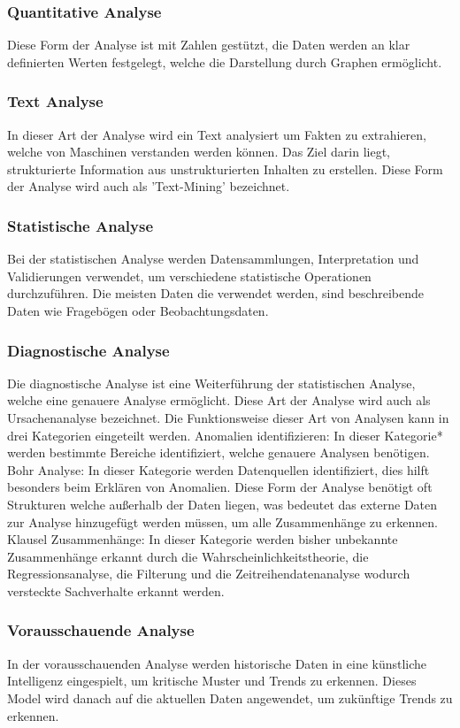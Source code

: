 \subsubsection{Quantitative Analyse}
Diese Form der Analyse ist mit Zahlen gestützt, die Daten werden an klar definierten Werten festgelegt, welche die Darstellung durch Graphen ermöglicht.		
\subsubsection{Text Analyse}
In dieser Art der Analyse wird ein Text analysiert um Fakten zu extrahieren, welche von Maschinen verstanden werden können. 
Das Ziel darin liegt, strukturierte Information aus unstrukturierten Inhalten zu erstellen. Diese Form der Analyse wird auch als 'Text-Mining' bezeichnet.		
\subsubsection{Statistische Analyse}
Bei der statistischen Analyse werden Datensammlungen, Interpretation und Validierungen verwendet, um verschiedene statistische Operationen durchzuführen. 
Die meisten Daten die verwendet werden, sind beschreibende Daten wie Fragebögen oder Beobachtungsdaten. 			
\subsubsection{Diagnostische Analyse}
Die diagnostische Analyse ist eine Weiterführung der statistischen Analyse, welche eine genauere Analyse ermöglicht. Diese Art der Analyse wird auch als Ursachenanalyse bezeichnet. Die Funktionsweise dieser Art von Analysen kann in drei Kategorien eingeteilt werden. \newline
Anomalien identifizieren: In dieser Kategorie* werden bestimmte Bereiche identifiziert, welche genauere Analysen benötigen. \newline
Bohr Analyse: In dieser Kategorie werden Datenquellen identifiziert, dies hilft besonders beim Erklären von Anomalien. Diese Form der Analyse benötigt oft Strukturen welche außerhalb der Daten liegen, was bedeutet das externe Daten zur Analyse hinzugefügt werden müssen, um alle Zusammenhänge zu erkennen.  \newline
Klausel Zusammenhänge: In dieser Kategorie werden bisher unbekannte Zusammenhänge erkannt durch die Wahrscheinlichkeitstheorie, die Regressionsanalyse, die Filterung und die Zeitreihendatenanalyse wodurch versteckte Sachverhalte erkannt werden.  				
\subsubsection{Vorausschauende Analyse}
In der vorausschauenden Analyse werden historische Daten in eine künstliche Intelligenz eingespielt, um kritische Muster und Trends zu erkennen. 
Dieses Model wird danach auf die aktuellen Daten angewendet, um zukünftige Trends zu erkennen. 
\newpage
